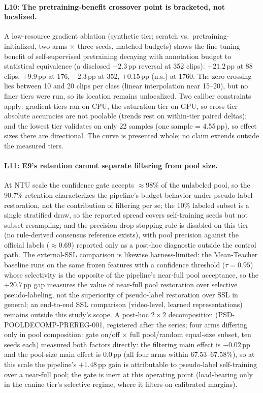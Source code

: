 \paragraph{L10: The pretraining-benefit crossover point is bracketed, not localized.}
A low-resource gradient ablation (synthetic tier; scratch vs.\ pretraining-initialized, two arms $\times$ three seeds, matched budgets) shows the fine-tuning benefit of self-supervised pretraining decaying with annotation budget to statistical equivalence (a disclosed $-2.3$\,pp reversal at 352 clips): $+21.2$\,pp at 88 clips, $+9.9$\,pp at 176, $-2.3$\,pp at 352, $+0.15$\,pp (n.s.) at 1760. The zero crossing lies between 10 and 20 clips per class (linear interpolation near 15--20), but no finer tiers were run, so its location remains unlocalized. Two caliber constraints apply: gradient tiers ran on CPU, the saturation tier on GPU, so cross-tier absolute accuracies are not poolable (trends rest on within-tier paired deltas); and the lowest tier validates on only 22 samples (one sample = 4.55\,pp), so effect sizes there are directional. The curve is presented whole; no claim extends outside the measured tiers.

\paragraph{L11: E9's retention cannot separate filtering from pool size.}
At NTU scale the confidence gate accepts $\approx$98\% of the unlabeled pool, so the 90.7\% retention characterizes the pipeline's budget behavior under pseudo-label restoration, not the contribution of filtering per se; the 10\% labeled subset is a single stratified draw, so the reported spread covers self-training seeds but not subset resampling; and the precision-drop stopping rule is disabled on this tier (no rule-derived consensus reference exists), with pool precision against the official labels ($\approx$0.69) reported only as a post-hoc diagnostic outside the control path. The external-SSL comparison is likewise harness-limited: the Mean-Teacher baseline runs on the same frozen features with a confidence threshold ($\tau{=}0.95$) whose selectivity is the opposite of the pipeline's near-full pool acceptance, so the $+20.7$\,pp gap measures the value of near-full pool restoration over selective pseudo-labeling, not the superiority of pseudo-label restoration over SSL in general; an end-to-end SSL comparison (video-level, learned representations) remains outside this study's scope. A post-hoc $2\times2$ decomposition (PSD-POOLDECOMP-PREREG-001, registered after the series; four arms differing only in pool composition: gate on/off $\times$ full pool/random equal-size subset, ten seeds each) measured both factors directly: the filtering main effect is $-0.02$\,pp and the pool-size main effect is $0.0$\,pp (all four arms within $67.53$--$67.58\%$), so at this scale the pipeline's $+1.48$\,pp gain is attributable to pseudo-label self-training over a near-full pool; the gate is inert at this operating point (load-bearing only in the canine tier's selective regime, where it filters on calibrated margins).

